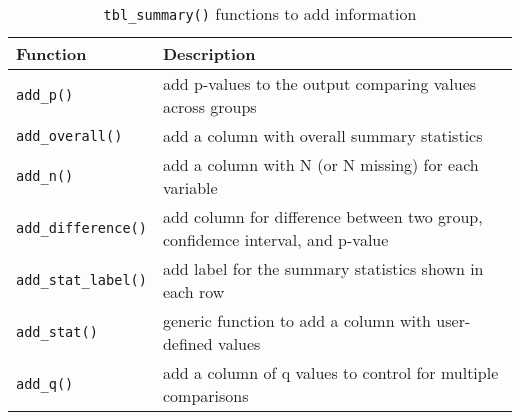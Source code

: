 \captionsetup[table]{labelformat=empty,skip=1pt}
\begin{longtable}{ll}
\caption{\label{tab:}\texttt{tbl\_summary()} functions to add information}\\
\toprule
Function & Description \\ 
\midrule
\texttt{add\_p()} & add p-values to the output comparing values across groups \\ 
\texttt{add\_overall()} & add a column with overall summary statistics \\ 
\texttt{add\_n()} & add a column with N (or N missing) for each variable \\ 
\texttt{add\_difference()} & add column for difference between two group, confidemce interval, and p-value \\ 
\texttt{add\_stat\_label()} & add label for the summary statistics shown in each row \\ 
\texttt{add\_stat()} & generic function to add a column with user-defined values \\ 
\texttt{add\_q()} & add a column of q values to control for multiple comparisons \\ 
\bottomrule
\end{longtable}

